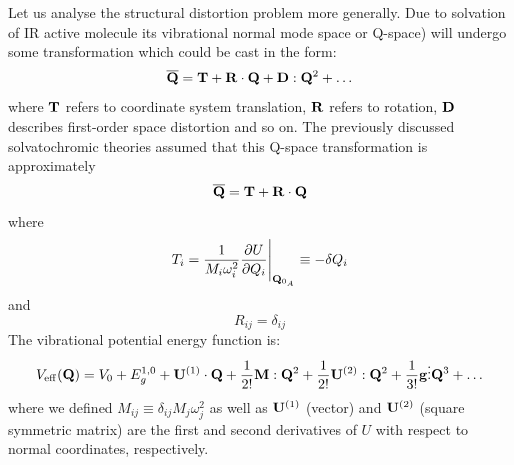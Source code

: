 \documentclass[a4paper,titlepage,twoside,fleqn,12pt]{book}
\newcommand{\fderiv}[2]{\ensuremath{
    \frac{\partial #1}{\partial #2}}}
\begin{document}
\begin{refsection}
Let us analyse the structural distortion problem more generally.
Due to solvation of IR active molecule its vibrational normal mode space 
or Q-space) will
undergo some transformation which could be cast in the form:
%
\begin{equation}  \label{e:Q-space-transform}
{\bf \overline{Q}} = {\bf T} + {\bf R} \cdot {\bf Q} + {\bf D} : {\bf Q}^2 + \ldots
\end{equation}
%
where ${\bf T}$ refers to coordinate system translation, ${\bf R}$ refers to rotation,
${\bf D}$ describes first\hyp{}order space distortion and so on. The previously
discussed solvatochromic theories assumed that this Q-space transformation is approximately
%
\begin{equation}\label{e:Q-space-transform-theory-0}
{\bf \overline{Q}} = {\bf T} + {\bf R} \cdot {\bf Q}
\end{equation}
%
where 
%
\begin{equation}\label{e:T-th-0}
T_i = \frac{1}{M_i\omega_i^2}\fderiv{U}{Q_i}  \Bigg|_{{\bf Q}_{0_A}}       
 \equiv -\delta Q_i
\end{equation}
and
\begin{equation}\label{e:R-th-0}
R_{ij} = \delta_{ij}
\end{equation}
%
The vibrational potential energy function is:
%
\begin{equation}\label{e:V}
V_{\rm eff} ({\bf Q})
= V_0 + E^{\rm 1,0}_g + {\bf U}^{(1)} \cdot {\bf Q} + \frac{1}{2!} {\bf M} : {\bf Q}^2 + 
\frac{1}{2!} {\bf U}^{(2)} : {\bf Q}^2 + \frac{1}{3!} {\bf g} \vdots {\bf Q}^3 + \ldots
\end{equation}
%
where we defined $M_{ij} \equiv \delta_{ij}M_j\omega_j^2$
as well as ${\bf U}^{(1)}$ (vector) and ${\bf U}^{(2)}$ (square symmetric matrix) 
are the first and second derivatives
of $U$ with respect to normal coordinates, respectively.


\end{refsection}
\end{document}
